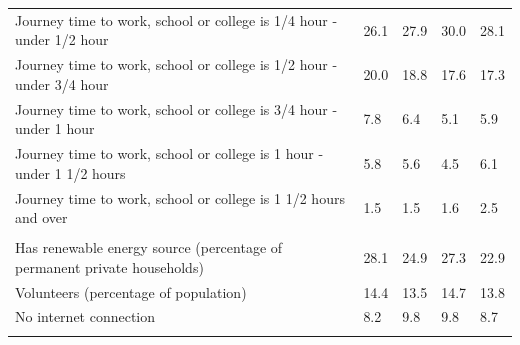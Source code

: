 \documentclass{article}
\begin{document}
\begin{table}[h]
\begin{tabular}{KTTTT}
Journey time to work, school or college is 1/4 hour - under 1/2 hour & 26.1& 27.9& 30.0& 28.1\\
Journey time to work, school or college is 1/2 hour - under 3/4 hour & 20.0& 18.8& 17.6& 17.3\\
Journey time to work, school or college is 3/4 hour - under 1 hour & 7.8& 6.4& 5.1& 5.9\\
Journey time to work, school or college is 1 hour - under 1 1/2 hours & 5.8& 5.6& 4.5& 6.1\\
Journey time to work, school or college is 1 1/2 hours and over & 1.5& 1.5& 1.6& 2.5\\
\hline
    \\ 
    \hline
Has renewable energy source (percentage of permanent private households) & 28.1& 24.9& 27.3& 22.9\\
    \hline
Volunteers (percentage of population) & 14.4& 13.5& 14.7& 13.8\\
    \hline
No internet connection& 8.2& 9.8& 9.8& 8.7\\
\hline
\end{tabular}
\end{table}
\end{document}
